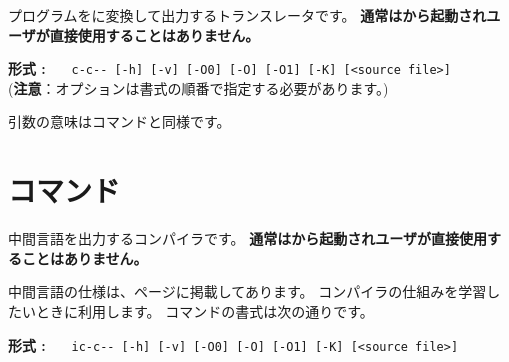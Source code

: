 {\cmm}プログラムを{\cl}に変換して出力するトランスレータです。
{\bf 通常は{\cmc}から起動されユーザが直接使用することはありません。}

\begin{flushleft}
{\bf 形式 : }~~~\verb/c-c-- [-h] [-v] [-O0] [-O] [-O1] [-K] [<source file>]/\\
({\bf 注意}：オプションは書式の順番で指定する必要があります。)
\end{flushleft}


引数の意味は{\cmmc}コマンドと同様です。




\section{{\icmmc}コマンド}
\label{command:icmmc}

中間言語を出力する{\cmm}コンパイラです。
{\bf 通常は{\cmi}から起動されユーザが直接使用することはありません。}

中間言語の仕様は、\pageref{app:vm}ページに掲載してあります。
コンパイラの仕組みを学習したいときに利用します。
{\icmmc}コマンドの書式は次の通りです。

\begin{flushleft}
{\bf 形式 : }~~~\verb/ic-c-- [-h] [-v] [-O0] [-O] [-O1] [-K] [<source file>]/
\end{flushleft}

